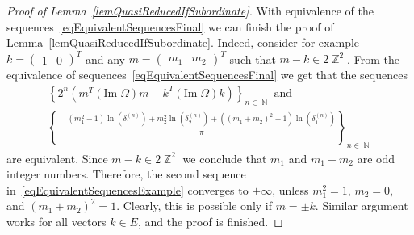 \documentclass{amsart}
\numberwithin{equation}{section}
\theoremstyle{definition}
\theoremstyle{remark}
\DeclareMathOperator{\ZZ}{\mathbb Z}
\DeclareMathOperator{\NN}{\mathbb N}
\begin{document}
\begin{proof}[Proof of Lemma~\ref{lemQuasiReducedIfSubordinate}]
		With equivalence of the sequences~\eqref{eqEquivalentSequencesFinal} we can finish the proof of Lemma~\ref{lemQuasiReducedIfSubordinate}. Indeed, consider for example $k = \begin{pmatrix} 1 & 0 \end{pmatrix}^T$ and any $m = \begin{pmatrix} m_1 & m_2\end{pmatrix}^T$ such that $m - k \in 2\ZZ^2$. From the equivalence of sequences~\eqref{eqEquivalentSequencesFinal} we get that the sequences
		\begin{multline}\label{eqEquivalentSequencesExample}
			\left\{2^n(m^T (\mathrm{Im}\;\Omega) m - k^T (\mathrm{Im}\;\Omega) k) \right\}_{n \in \NN} \text{ and } \\ \left\{ -\frac{(m_1^2 - 1) \ln\left(\delta_1^{(n)}\right) + m_2^2 \ln\left(\delta_2^{(n)}\right) +((m_1 + m_2)^2-1) \ln\left(\delta_1^{(n)}\right)}{\pi}   \right\}_{n \in \NN}
		\end{multline}
		are equivalent. Since $m - k \in 2\ZZ^2$ we conclude that $m_1$ and $m_1 + m_2$ are odd integer numbers. Therefore, the second sequence in~\eqref{eqEquivalentSequencesExample} converges to $+\infty$, unless $m_1^2 = 1$, $m_2 = 0$, and $(m_1 + m_2)^2 = 1$. Clearly, this is possible only if $m = \pm k$. Similar argument works for all vectors $k \in E$, and the proof is finished.
	\end{proof}
\end{document}
